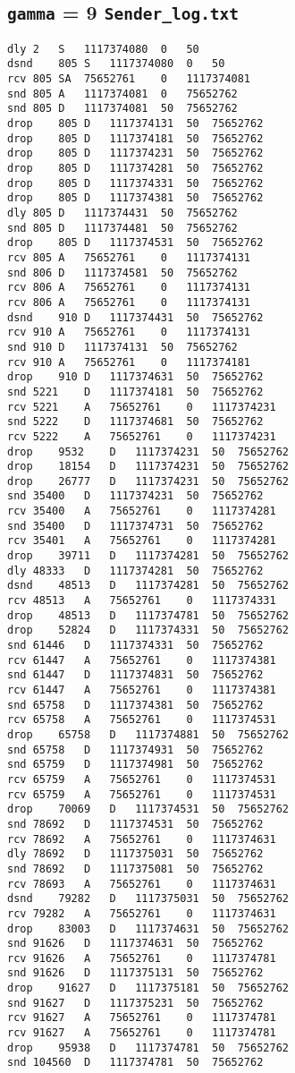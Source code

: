 \documentclass[a4paper]{article}
\begin{document}
\subsection{\texttt{gamma} = 9 \texttt{Sender\_log.txt}}
\begin{lstlisting}
dly	2	S	1117374080	0	50
dsnd	805	S	1117374080	0	50
rcv	805	SA	75652761	0	1117374081
snd	805	A	1117374081	0	75652762
snd	805	D	1117374081	50	75652762
drop	805	D	1117374131	50	75652762
drop	805	D	1117374181	50	75652762
drop	805	D	1117374231	50	75652762
drop	805	D	1117374281	50	75652762
drop	805	D	1117374331	50	75652762
drop	805	D	1117374381	50	75652762
dly	805	D	1117374431	50	75652762
snd	805	D	1117374481	50	75652762
drop	805	D	1117374531	50	75652762
rcv	805	A	75652761	0	1117374131
snd	806	D	1117374581	50	75652762
rcv	806	A	75652761	0	1117374131
rcv	806	A	75652761	0	1117374131
dsnd	910	D	1117374431	50	75652762
rcv	910	A	75652761	0	1117374131
snd	910	D	1117374131	50	75652762
rcv	910	A	75652761	0	1117374181
drop	910	D	1117374631	50	75652762
snd	5221	D	1117374181	50	75652762
rcv	5221	A	75652761	0	1117374231
snd	5222	D	1117374681	50	75652762
rcv	5222	A	75652761	0	1117374231
drop	9532	D	1117374231	50	75652762
drop	18154	D	1117374231	50	75652762
drop	26777	D	1117374231	50	75652762
snd	35400	D	1117374231	50	75652762
rcv	35400	A	75652761	0	1117374281
snd	35400	D	1117374731	50	75652762
rcv	35401	A	75652761	0	1117374281
drop	39711	D	1117374281	50	75652762
dly	48333	D	1117374281	50	75652762
dsnd	48513	D	1117374281	50	75652762
rcv	48513	A	75652761	0	1117374331
drop	48513	D	1117374781	50	75652762
drop	52824	D	1117374331	50	75652762
snd	61446	D	1117374331	50	75652762
rcv	61447	A	75652761	0	1117374381
snd	61447	D	1117374831	50	75652762
rcv	61447	A	75652761	0	1117374381
snd	65758	D	1117374381	50	75652762
rcv	65758	A	75652761	0	1117374531
drop	65758	D	1117374881	50	75652762
snd	65758	D	1117374931	50	75652762
snd	65759	D	1117374981	50	75652762
rcv	65759	A	75652761	0	1117374531
rcv	65759	A	75652761	0	1117374531
drop	70069	D	1117374531	50	75652762
snd	78692	D	1117374531	50	75652762
rcv	78692	A	75652761	0	1117374631
dly	78692	D	1117375031	50	75652762
snd	78692	D	1117375081	50	75652762
rcv	78693	A	75652761	0	1117374631
dsnd	79282	D	1117375031	50	75652762
rcv	79282	A	75652761	0	1117374631
drop	83003	D	1117374631	50	75652762
snd	91626	D	1117374631	50	75652762
rcv	91626	A	75652761	0	1117374781
snd	91626	D	1117375131	50	75652762
drop	91627	D	1117375181	50	75652762
snd	91627	D	1117375231	50	75652762
rcv	91627	A	75652761	0	1117374781
rcv	91627	A	75652761	0	1117374781
drop	95938	D	1117374781	50	75652762
snd	104560	D	1117374781	50	75652762

\end{lstlisting}
\end{document}
